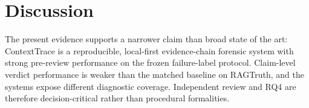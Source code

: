 \section{Discussion}
The present evidence supports a narrower claim than broad state of the art:
ContextTrace is a reproducible, local-first evidence-chain forensic system with
strong pre-review performance on the frozen failure-label protocol. Claim-level
verdict performance is weaker than the matched baseline on RAGTruth, and the
systems expose different diagnostic coverage. Independent review and RQ4 are
therefore decision-critical rather than procedural formalities.


